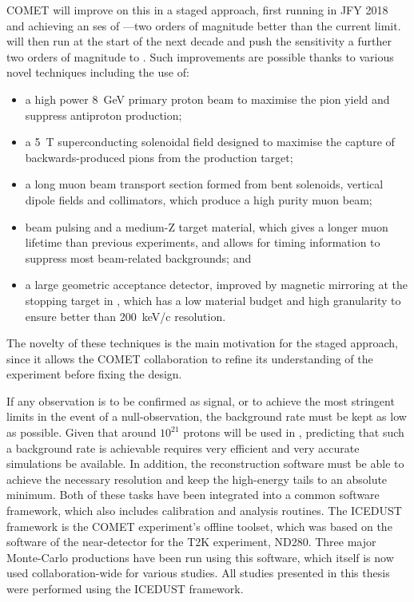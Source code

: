 COMET will improve on this in a staged approach, first running in \ac{JFY} 2018 and achieving an \ac{ses} of \sensePI---two orders of magnitude better than the current limit.
\phaseII will then run at the start of the next decade and push the sensitivity a further two orders of magnitude to \sensePII.
Such improvements are possible thanks to various novel techniques including the use of: 
\begin{itemize}
\item a high power 8~GeV primary proton beam to maximise the pion yield and suppress antiproton production;
\item a 5~T superconducting solenoidal field designed to maximise the capture of backwards-produced pions from the production target;
\item a long muon beam transport section formed from bent solenoids, vertical dipole fields and collimators, which produce a high purity muon beam;
\item beam pulsing and a medium-Z target material, which gives a longer muon lifetime than previous experiments, and allows for timing information to suppress most beam-related backgrounds; and
\item a large geometric acceptance detector, improved by magnetic mirroring at the stopping target in \phaseII, which has a low material budget and high granularity to ensure better than 200~keV/c resolution.
\end{itemize}
The novelty of these techniques is the main motivation for the staged approach, since it allows the COMET collaboration to refine its understanding of the experiment before fixing the \phaseII design.

If any observation is to be confirmed as signal, or to achieve the most stringent limits in the event of a null-observation, the background rate must be kept as low as possible.
Given that around $10^{21}$ protons will be used in \phaseII, predicting that such a background rate is achievable requires very efficient and very accurate simulations be available.
In addition, the reconstruction software must be able to achieve the necessary resolution and keep the high-energy tails to an absolute minimum.
Both of these tasks have been integrated into a common software framework, which also includes calibration and analysis routines.
The ICEDUST framework is the COMET experiment's offline toolset, which was based on the software of the near-detector for the T2K experiment, ND280.
Three major Monte-Carlo productions have been run using this software, which itself is now used collaboration-wide for various studies.
All studies presented in this thesis were performed using the ICEDUST framework.

